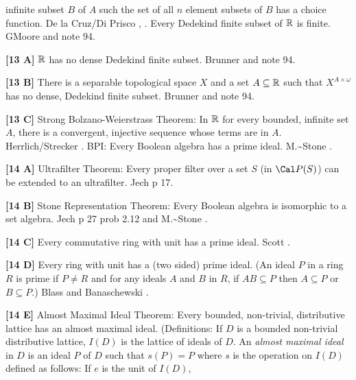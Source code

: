 infinite subset $B$ of $A$ such the set of all $n$ element subsets of
$B$ has a choice function. 
\ac{De la Cruz/Di Prisco} \cite{1998a}, \cite{1998b}.
\medskip
{} Every Dedekind finite subset of ${\Bbb R}$ is
finite.  G\. \ac{Moore} \cite{1982} and note 94.
\smallskip
\item{}{\bf [13 A]} ${\Bbb R}$ has no dense Dedekind finite subset.
\ac{Brunner} \cite{1982d} and note 94.
\smallskip
\item{}{\bf [13 B]}  There is a separable topological space $X$ and a set
$A\subseteq{\Bbb R}$ such that $X^{A\times\omega }$ has no dense,
Dedekind finite subset. \ac{Brunner} \cite{1982d} and note 94.
\smallskip
\item{}{\bf [13 C]}  Strong Bolzano-Weierstrass Theorem:  In ${\Bbb R}$ for
every bounded, infinite set $A$, there is a convergent, injective sequence
whose terms are in $A$.  \ac{Herrlich/Strecker} \cite{1997}.
\medskip
{} BPI: Every Boolean algebra has a prime ideal.
\ac{M.~Stone} \cite{1936}.
\smallskip
\item{}{\bf [14 A]}  Ultrafilter Theorem:  Every proper filter over a
set $S$ (in ${\Cal P}(S)$) can be extended to an ultrafilter.
\ac{Jech} \cite{1973b} p 17.
\smallskip
\item{}{\bf [14 B]}  Stone Representation Theorem:  Every Boolean  algebra
is isomorphic to a set algebra.  \ac{Jech} \cite{1973b} p 27 prob 2.12 and
\ac{M.~Stone} \cite{1936}. 
\smallskip
\item{}{\bf [14 C]}  Every commutative ring with unit has a  prime  ideal.
\ac{Scott} \cite{1954}.
\smallskip
\item{}{\bf [14 D]}  Every ring with unit has a (two sided)  prime  ideal.
(An ideal $P$ in a ring $R$ is prime if $P \neq  R$  and  for  any
ideals $A$ and $B$ in $R$, if $AB \subseteq  P$ then $A \subseteq  P$ or
$B\subseteq P$.)  \ac{Blass} \cite{1986} and \ac{Banaschewski} \cite{1985}.
\smallskip
\item{}{\bf [14 E]}  Almost Maximal Ideal Theorem:  Every bounded,
non-trivial, distributive lattice has an almost maximal ideal.
(Definitions:  If $D$  is  a  bounded  non-trivial  distributive
lattice, $I(D)$ is the lattice of ideals of $D$.  An {\it almost maximal
ideal} in $D$ is an ideal $P$ of $D$ such that $s(P) = P$  where $s$ is
the operation on $I(D)$ defined as follows: If $e$ is the unit of $I(D)$,
